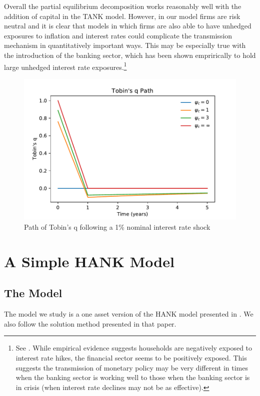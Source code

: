 \documentclass[titlepage]{\econtex}\newcommand{\texname}{ConsumptionHeterogeneity}
\begin{document}
Overall the partial equilibrium decomposition works reasonably well with the addition of capital in the TANK model. However, in our model firms are risk neutral and it is clear that models in which firms are also able to have unhedged exposures to inflation and interest rates could complicate the transmission mechanism in quantitatively important ways. This may be especially true with the introduction of the banking sector, which has been shown emprirically to hold large unhedged interest rate exposures.\footnote{See \cite{landier_banks_2013}. While empirical evidence suggests households are negatively exposed to interest rate hikes, the financial sector seems to be positively exposed. This suggests the transmission of monetary policy may be very different in times when the banking sector is working well to those when the banking sector is in crisis (when interest rate declines may not be as effective).}

\begin{figure} 
	\begin{centering}
		\includegraphics[scale=0.7]{../Python/DoloCode/Figures/TANK_capital_IRF_q.pdf}
		\caption{Path of Tobin's q following a 1\% nominal interest rate shock}
		\label{fig:PathTobinq}
	\end{centering}
\end{figure}

\section{A Simple HANK Model}

\subsection{The Model}
The model we study is a one asset version of the HANK model presented in \cite{blSolving}. We also follow the solution method presented in that paper.
\end{document}
